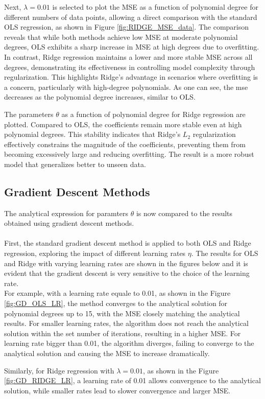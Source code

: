 \documentclass[
    article
 reprint,            %
 amsmath,amssymb,
 aps,
]{revtex4-2}
\begin{document}


Next, $\lambda = 0.01$ is selected to plot the MSE as a function of polynomial degree for different numbers of data points, allowing a direct comparison with the standard OLS regression, as shown in Figure \ref{fig:RIDGE_MSE_data}. 
The comparison reveals that while both methods achieve low MSE at moderate polynomial degrees, OLS exhibits a sharp increase in MSE at high degrees due to overfitting. In contrast, Ridge regression maintains a lower and more stable MSE across all degrees, demonstrating its effectiveness in controlling model complexity through regularization. This highlights Ridge's advantage in scenarios where overfitting is a concern, particularly with high-degree polynomials.
As one can see, the mse decreases as the polynomial degree increases, similar to OLS.


The parameters $\theta$ as a function of polynomial degree for Ridge regression are plotted. Compared to OLS, the coefficients remain more stable even at high polynomial degrees. 
This stability indicates that Ridge's $L_2$ regularization effectively constrains the magnitude of the coefficients, preventing them from becoming excessively large and reducing overfitting.
The result is a more robust model that generalizes better to unseen data.

\subsection{Gradient Descent Methods}
\label{Gradient Descent Methods}

The analytical expression for paramters $\theta$ is now compared to the results obtained using gradient descent methods.\\\\
First, the standard gradient descent method is applied to both OLS and Ridge regression, exploring the impact of different learning rates $\eta$. 
The results for OLS and Ridge with varying learning rates are shown in the figures below and it is evident that the gradient descent is very sensitive to the choice of the learning rate.\\
For example, with a learning rate equale to 0.01, as shown in the Figure \ref{fig:GD_OLS_LR}, the method converges to the analytical solution for polynomial degrees up to 15, with the MSE closely matching the analytical results.
For smaller learning rates, the algorithm does not reach the analytical solution within the set number of iterations, resulting in a higher MSE. 
For learning rate bigger than 0.01, the algorithm diverges, failing to converge to the analytical solution and causing the MSE to increase dramatically.

Similarly, for Ridge regression with $\lambda = 0.01$, as shown in the Figure \ref{fig:GD_RIDGE_LR}, a learning rate of 0.01 allows convergence to the analytical solution, while smaller rates lead to slower convergence and larger MSE.

 
\end{document}
